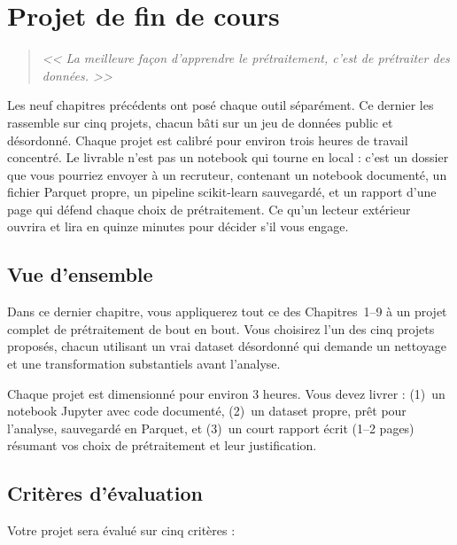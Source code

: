 \chapter{Projet de fin de cours}
\label{ch:capstone}

\begin{quote}
\emph{<< La meilleure fa\c{c}on d'apprendre le pr\'etraitement, c'est de pr\'etraiter des donn\'ees. >>}
\end{quote}

Les neuf chapitres précédents ont posé chaque outil séparément. Ce dernier les rassemble sur cinq projets, chacun bâti sur un jeu de données public et désordonné. Chaque projet est calibré pour environ trois heures de travail concentré. Le livrable n'est pas un notebook qui tourne en local : c'est un dossier que vous pourriez envoyer à un recruteur, contenant un notebook documenté, un fichier Parquet propre, un pipeline scikit-learn sauvegardé, et un rapport d'une page qui défend chaque choix de prétraitement. Ce qu'un lecteur extérieur ouvrira et lira en quinze minutes pour décider s'il vous engage.
\section{Vue d'ensemble}

Dans ce dernier chapitre, vous appliquerez tout ce des Chapitres~1--9 \`a un projet complet de pr\'etraitement de bout en bout. Vous choisirez l'un des cinq projets propos\'es, chacun utilisant un vrai dataset d\'esordonn\'e qui demande un nettoyage et une transformation substantiels avant l'analyse.

\begin{datatip}
Chaque projet est dimensionn\'e pour environ 3 heures. Vous devez livrer : (1)~un notebook Jupyter avec code document\'e, (2)~un dataset propre, pr\^et pour l'analyse, sauvegard\'e en Parquet, et (3)~un court rapport \'ecrit (1--2 pages) r\'esumant vos choix de pr\'etraitement et leur justification.
\end{datatip}

\section{Crit\`eres d'\'evaluation}

Votre projet sera \'evalu\'e sur cinq crit\`eres :

